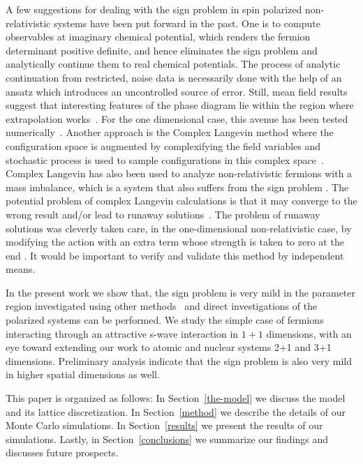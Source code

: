 \documentclass[aps,eqsecnum,amsmath,onecolumn,groupedaddress,superscriptaddress,notitlepage,nofootinbib]{revtex4-1}
\begin{document}
A few suggestions for dealing with the sign problem in spin polarized non-relativistic systems have been put forward in the past. One  is to compute observables at imaginary chemical potential, which renders the fermion determinant positive definite, and hence eliminates the sign problem and analytically continue them to real chemical potentials. 
The process of analytic continuation from restricted, noise data is necessarily done with the help of an ansatz which introduces an uncontrolled source of error. Still, mean field results suggest that interesting features of the phase diagram lie within the region where extrapolation works~\cite{Braun:2012ww}. For the one dimensional case, this avenue has been tested numerically~\cite{PhysRevA.92.063609}. Another approach is the Complex Langevin method where the configuration space is augmented by complexifying the field variables and stochastic process is used to sample configurations in this complex space~\cite{Rammelmuller:2017myk,Loheac:2017uuj}. Complex Langevin has also been used to analyze non-relativistic fermions with a mass imbalance, which is a system that also suffers from the sign problem \cite{PhysRevD.96.094506}.
The potential problem of complex Langevin calculations is that it may converge to the wrong result and/or lead to runaway solutions~\cite{Aarts:2010aq,PhysRevD.88.116007,Aarts:2011ax}. The problem of runaway solutions was cleverly taken care, in the one-dimensional non-relativistic case, by modifying the action with an extra term whose strength is taken to zero at the end \cite{Drut:2017fsv,PhysRevD.95.094502}. It would be important to verify and validate this method by independent means.


In the present work we show that,  the sign problem is very mild in the parameter region investigated using other methods~\cite{PhysRevA.92.063609,Rammelmuller:2017myk} and direct investigations of the polarized systems can be performed. We study the simple case of fermions interacting through an attractive s-wave interaction in $1+1$ dimensions, with an eye toward extending our work to atomic and nuclear systems 2+1 and 3+1 dimensions. Preliminary analysis indicate that the sign problem is also very mild in higher spatial dimensions as well.

This paper is organized as follows: In Section~\ref{the-model} we discuss the model and its
lattice discretization. In Section~\ref{method} we describe the details of our Monte Carlo simulations. In Section~\ref{results} we present the results of our simulations. Lastly, in Section~\ref{conclusions} we summarize our findings and discusses future prospects.
\end{document}
